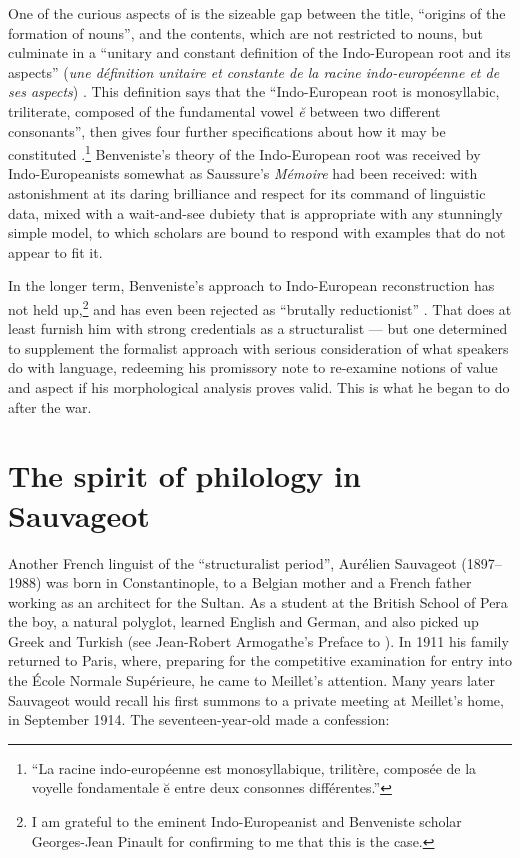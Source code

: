 \documentclass[output=paper]{langscibook}
\begin{document}
One of the curious aspects of \citet{Benveniste1935} is the sizeable gap between the title, ``origins of the formation of nouns'', and the contents, which are not restricted to nouns, but culminate in a ``unitary and constant definition of the Indo-European root and its aspects'' (\emph{une définition unitaire et constante de la racine indo-européenne et de ses aspects}) \citep[170]{Benveniste1935}. This definition says that the ``Indo-European root is monosyllabic, triliterate, composed of the fundamental vowel \emph{ĕ} between two different consonants'', then gives four further specifications about how it may be constituted \citep[170--171]{Benveniste1935}.\footnote{``La racine indo-européenne est monosyllabique, trilitère, composée de la voyelle fondamentale ĕ entre deux consonnes différentes.''} Benveniste's theory of the Indo-European root was received by Indo-Europeanists somewhat as Saussure's \emph{Mémoire} had been received: with astonishment at its daring brilliance and respect for its command of linguistic data, mixed with a wait-and-see dubiety that is appropriate with any stunningly simple model, to which scholars are bound to respond with examples that do not appear to fit it.

\largerpage[1]In the longer term, Benveniste's approach to Indo-European reconstruction has not held up,\footnote{I am grateful to the eminent Indo-Europeanist and Benveniste scholar Georges-Jean Pinault for confirming to me that this is the case.} and has even been rejected as ``brutally reductionist'' \citep[560]{Dunkel1981}. That does at least furnish him with strong credentials as a structuralist — but one determined to supplement the formalist approach with serious consideration of what speakers do with language, redeeming his \citeyear{Benveniste1935} promissory note to re-examine notions of value and aspect if his morphological analysis proves valid. This is what he began to do after the war.

\section{The spirit of philology in Sauvageot}
\label{sec:joseph:sauvageot}

Another French linguist of the ``structuralist period'', Aurélien Sauvageot (1897--1988) was born in Constantinople, to a Belgian mother and a French father working as an architect for the Sultan. As a student at the British School of Pera the boy, a natural polyglot, learned English and German, and also picked up Greek and Turkish (see Jean-Robert Armogathe's Preface to \citealt[9]{Sauvageot2013}). In 1911 his family returned to Paris, where, preparing for the competitive examination for entry into the École Normale Supérieure, he came to Meillet's attention. Many years later Sauvageot would recall his first summons to a private meeting at Meillet's home, in September 1914. The seventeen-year-old made a confession:
\end{document}
